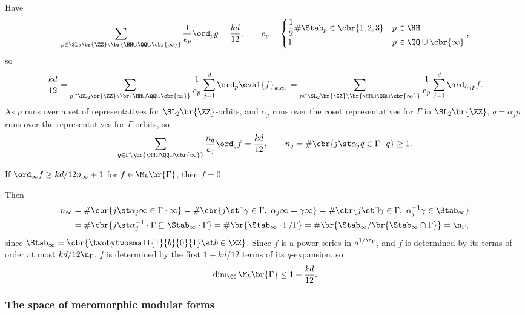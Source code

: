 Have
$$ \sum_{p \in \SL_2\br{\ZZ} \backslash \br{\HH \cup \QQ \cup \cbr{\infty}}} \dfrac{1}{e_p}\ord_p g = \dfrac{kd}{12}, \qquad e_p =
\begin{cases}
\dfrac{1}{2}\#\Stab_p \in \cbr{1, 2, 3} & p \in \HH \\
1 & p \in \QQ \cup \cbr{\infty}
\end{cases},
$$
so
$$ \dfrac{kd}{12} = \sum_{p \in \SL_2\br{\ZZ} \backslash \br{\HH \cup \QQ \cup \cbr{\infty}}} \dfrac{1}{e_p}\sum_{j = 1}^d \ord_p \eval{f}_{k, \alpha_j} = \sum_{p \in \SL_2\br{\ZZ} \backslash \br{\HH \cup \QQ \cup \cbr{\infty}}} \dfrac{1}{e_p}\sum_{j = 1}^d \ord_{\alpha_jp} f. $$
As $ p $ runs over a set of representatives for $ \SL_2\br{\ZZ} $-orbits, and $ \alpha_j $ runs over the coset representatives for $ \Gamma $ in $ \SL_2\br{\ZZ} $, $ q = \alpha_jp $ runs over the representatives for $ \Gamma $-orbits, so
$$ \sum_{q \in \Gamma \backslash \br{\HH \cup \QQ \cup \cbr{\infty}}} \dfrac{n_q}{e_q}\ord_q f = \dfrac{kd}{12}, \qquad n_q = \#\cbr{j \st \alpha_jq \in \Gamma \cdot q} \ge 1. $$

\begin{corollary}
If $ \ord_\infty f \ge kd / 12n_\infty + 1 $ for $ f \in \M_k\br{\Gamma} $, then $ f = 0 $.
\end{corollary}

Then
\begin{align*}
n_\infty
& = \#\cbr{j \st \alpha_j\infty \in \Gamma \cdot \infty}
= \#\cbr{j \st \exists \gamma \in \Gamma, \ \alpha_j\infty
= \gamma\infty} = \#\cbr{j \st \exists \gamma \in \Gamma, \ \alpha_j^{-1}\gamma \in \Stab_\infty} \\
& = \#\cbr{j \st \alpha_j^{-1} \cdot \Gamma \subseteq \Stab_\infty \cdot \Gamma}
= \#\br{\Stab_\infty \cdot \Gamma / \Gamma}
= \#\br{\Stab_\infty / \br{\Stab_\infty \cap \Gamma}}
= \n_\Gamma,
\end{align*}
since $ \Stab_\infty = \cbr{\twobytwosmall{1}{b}{0}{1} \st b \in \ZZ} $. Since $ f $ is a power series in $ q^{1 / \n_\Gamma} $, and $ f $ is determined by its terms of order at most $ kd / 12\n_\Gamma $, $ f $ is determined by the first $ 1 + kd / 12 $ terms of its $ q $-expansion, so
$$ \dim_\CC \M_k\br{\Gamma} \le 1 + \dfrac{kd}{12}. $$

\pagebreak

\subsubsection{The space of meromorphic modular forms}

